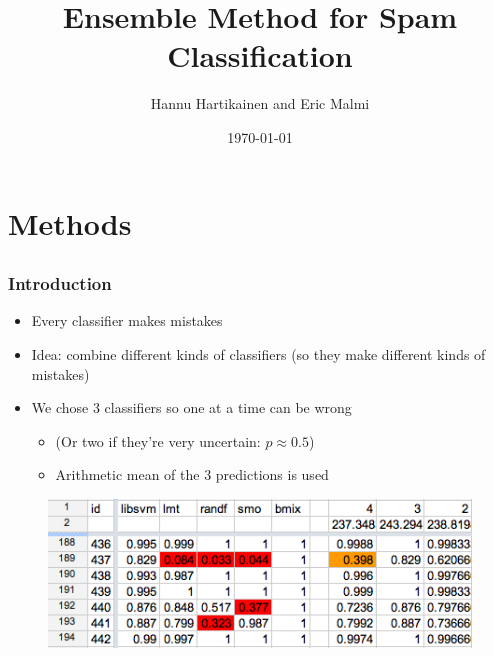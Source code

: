 \documentclass{beamer}
\title{Ensemble Method for Spam Classification}
\author{Hannu Hartikainen and Eric Malmi}
\date{\today}
\begin{document}
\setlength{\unitlength}{\textwidth}

\frame{\titlepage}

\section{Methods}
\subsection{}

\frame
{
  \frametitle{Introduction}

  \begin{itemize}
    \item Every classifier makes mistakes
    \item Idea: combine different kinds of classifiers (so they make different kinds of mistakes)
    \item We chose 3 classifiers so one at a time can be wrong
    \begin{itemize}
        \item (Or two if they're very uncertain: $p \approx 0.5$)
        \item Arithmetic mean of the 3 predictions is used
    \end{itemize}
  \end{itemize}

\begin{figure}
	\centering
	\includegraphics[width=\textwidth]{spreadsheet.png}
\end{figure}
}
\end{document}
